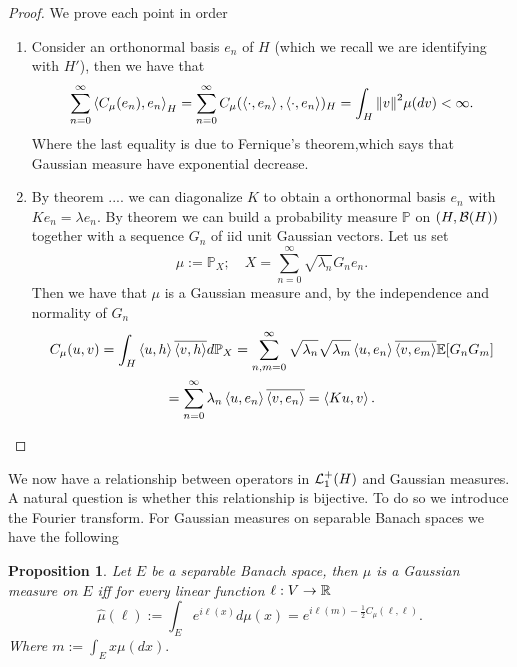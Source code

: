 \documentclass[12pt]{article}
\newtheorem{proposition}{Proposition}
\newcommand{\br}[1]{\left\langle#1\right\rangle}
\begin{document}
\begin{proof} We prove each point in order

    \begin{enumerate}        \item Consider an orthonormal basis $e_n$ of $H$ (which we recall we are identifying with $H'$), then we have that
              \begin{equation*}
                  \sum_{n=0}^{\infty} \br{C_\mu (e_n),e_n}_H=\sum_{n=0}^{\infty} C_\mu (\br{\cdot ,e_n},\br{\cdot ,e_n})_H=\int_{H}\norm{v}^2 \mu (dv)<\infty.
              \end{equation*}
              Where the last equality is due to Fernique's theorem,which says that Gaussian measure have exponential decrease.
        \item By theorem .... we can diagonalize $K$ to obtain a orthonormal basis  $e_n$ with  $Ke_n=\lambda e_n$. By theorem we can build a probability measure $\mathbb{P}$ on $(H,\mathcal{B}(H))$ together with a sequence $G_n$ of iid unit Gaussian vectors. Let us set
              \begin{equation*}
                  \mu :=\mathbb{P}_X;\quad X=\sum_{n=0}^{\infty} \sqrt{\lambda _n} G_ne_n .
              \end{equation*}
              Then we have that $\mu $ is a Gaussian measure and, by the  independence and normality of $G_n$
              \begin{multline*}
                  C_\mu (u,v)=\int_{H}\br{u,h}\overline{\br{v,h}} d\mathbb{P}_X=\sum_{n,m=0}^{\infty}\sqrt{\lambda_n}\sqrt{\lambda_m}  \br{u,e_n}\overline{\br{v,e_m}}\E[G_nG_m]\\
                  =\sum_{n=0}^{\infty}\lambda_n\br{u,e_n}\overline{\br{v,e_n}}=\br{Ku,v}.
              \end{multline*}

    \end{enumerate}
\end{proof}
We now have a relationship between operators in $\mathcal{L}_1^+(H)$ and Gaussian measures. A natural question is whether this relationship is bijective. To do so we introduce the Fourier transform. For Gaussian measures on separable Banach spaces we have the following
\begin{proposition}
    Let $E$ be a separable Banach space, then $\mu $ is a Gaussian measure on $E$ iff for every linear function  $\ell :V\to{\mathbb R}$
    \begin{equation*}
        \hat{\mu }(\ell ):=\int_{E} e^{i\ell (x)}d\mu(x)=e^{i\ell(m)-\frac{1}{2}C_\mu (\ell ,\ell )}.
    \end{equation*}
    Where
    $        m:=\int_{E}x \mu (dx).
    $
\end{proposition}
\end{document}
